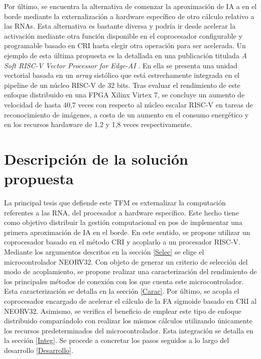 Por último, se encuentra la alternativa de comenzar la aproximación de IA a en el borde mediante la externalización a hardware específico de otro cálculo relativo a las RNAs.
Esta alternativa es bastante diversa y podría ir desde acelerar la activación mediante otra función disponible en el coprocesador configurable y programable basado en CRI hasta elegir otra operación para ser acelerada.
Un ejemplo de esta última propuesta es la detallada en una publicación titulada \textit{A Soft RISC-V Vector Processor for Edge-AI} \cite{9885953}.
En ella se presenta una unidad vectorial basada en un \textit{array} sistólico que está estrechamente integrada en el pipeline de un núcleo RISC-V de 32 bits. 
Tras evaluar el rendimiento de este enfoque distribuido en una FPGA Xilinx Virtex 7, se concluye un aumento de velocidad de hasta 40,7 veces con respecto al núcleo escalar RISC-V en tareas de reconocimiento de imágenes, a costa de un aumento en el consumo energético y en los recursos hardaware de 1,2 y 1,8 veces respectivamente. 

\section{Descripción de la solución propuesta}


La principal tesis que defiende este TFM es externalizar la computación referentes a las RNA, del procesador a hardware específico.
Este hecho tiene como objetivo distribuir la gestión computacional en pos de implementar una primera aproximación de IA en el borde.
En este sentido, se propone utilizar un coprocesador basado en el método CRI y acoplarlo a un procesador RISC-V.
Mediante los argumentos descritos en la sección \ref{Selec} se elige el microcontrolador NEORV32. 
Con objeto de generar un criterio de selección del modo de acoplamiento, se propone realizar una caracterización del rendimiento de los principales métodos de conexión con los que cuenta este microcontrolador.
Esta caracterización se detalla en la sección \ref{Carac}.
Por último, se acopla el coprocesador encargado de acelerar el cálculo de la FA sigmoide basado en CRI al NEORV32. 
Asimismo, se verifica el beneficio de emplear este tipo de enfoque distribuido comparándolo con realizar los mismos cálculos utilizando únicamente los recursos predeterminados del microcontrolador.
Esta integración se detalla en la sección \ref{Integ}.
Se procede a concretar los pasos seguidos a lo largo del desarrollo \ref{Desarrollo}.

